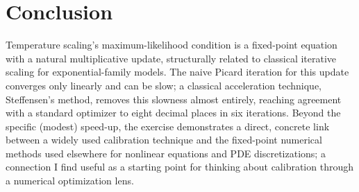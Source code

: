\documentclass[11pt]{article}
\begin{document}
\section{Conclusion}

Temperature scaling's maximum-likelihood condition is a fixed-point
equation with a natural multiplicative update, structurally related to
classical iterative scaling for exponential-family models. The naive
Picard iteration for this update converges only linearly and can be
slow; a classical acceleration technique, Steffensen's method, removes
this slowness almost entirely, reaching agreement with a standard
optimizer to eight decimal places in six iterations. Beyond the
specific (modest) speed-up, the exercise demonstrates a direct,
concrete link between a widely used calibration technique and the
fixed-point numerical methods used elsewhere for nonlinear equations
and PDE discretizations; a connection I find useful as a
starting point for thinking about calibration through a numerical
optimization lens.








\end{document}
